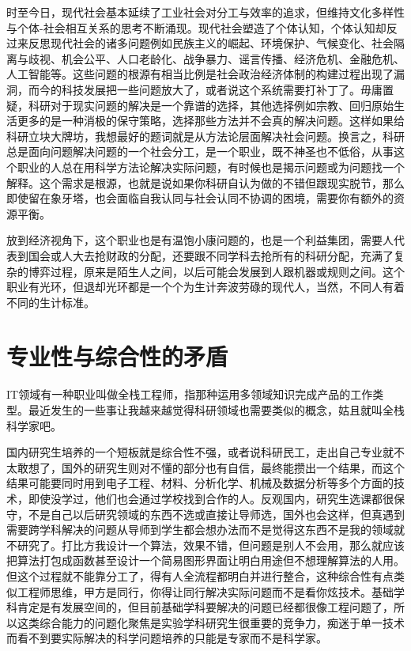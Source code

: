 \documentclass[]{tufte-book}
\begin{document}
时至今日，现代社会基本延续了工业社会对分工与效率的追求，但维持文化多样性与个体-社会相互关系的思考不断涌现。现代社会塑造了个体认知，个体认知却反过来反思现代社会的诸多问题例如民族主义的崛起、环境保护、气候变化、社会隔离与歧视、机会公平、人口老龄化、战争暴力、谣言传播、经济危机、金融危机、人工智能等。这些问题的根源有相当比例是社会政治经济体制的构建过程出现了漏洞，而今的科技发展把一些问题放大了，或者说这个系统需要打补丁了。毋庸置疑，科研对于现实问题的解决是一个靠谱的选择，其他选择例如宗教、回归原始生活更多的是一种消极的保守策略，选择那些方法并不会真的解决问题。这样如果给科研立块大牌坊，我想最好的题词就是从方法论层面解决社会问题。换言之，科研总是面向问题解决问题的一个社会分工，是一个职业，既不神圣也不低俗，从事这个职业的人总在用科学方法论解决实际问题，有时候也是揭示问题或为问题找一个解释。这个需求是根源，也就是说如果你科研自认为做的不错但跟现实脱节，那么即使留在象牙塔，也会面临自我认同与社会认同不协调的困境，需要你有额外的资源平衡。

放到经济视角下，这个职业也是有温饱小康问题的，也是一个利益集团，需要人代表到国会或人大去抢财政的分配，还要跟不同学科去抢所有的科研分配，充满了复杂的博弈过程，原来是陌生人之间，以后可能会发展到人跟机器或规则之间。这个职业有光环，但退却光环都是一个个为生计奔波劳碌的现代人，当然，不同人有着不同的生计标准。

\hypertarget{ux4e13ux4e1aux6027ux4e0eux7efcux5408ux6027ux7684ux77dbux76fe}{%
\section{专业性与综合性的矛盾}\label{ux4e13ux4e1aux6027ux4e0eux7efcux5408ux6027ux7684ux77dbux76fe}}

IT领域有一种职业叫做全栈工程师，指那种运用多领域知识完成产品的工作类型。最近发生的一些事让我越来越觉得科研领域也需要类似的概念，姑且就叫全栈科学家吧。

国内研究生培养的一个短板就是综合性不强，或者说科研民工，走出自己专业就不太敢想了，国外的研究生则对不懂的部分也有自信，最终能攒出一个结果，而这个结果可能要同时用到电子工程、材料、分析化学、机械及数据分析等多个方面的技术，即使没学过，他们也会通过学校找到合作的人。反观国内，研究生选课都很保守，不是自己以后研究领域的东西不选或直接让导师选，国外也会这样，但真遇到需要跨学科解决的问题从导师到学生都会想办法而不是觉得这东西不是我的领域就不研究了。打比方我设计一个算法，效果不错，但问题是别人不会用，那么就应该把算法打包成函数甚至设计一个简易图形界面让明白用途但不想理解算法的人用。但这个过程就不能靠分工了，得有人全流程都明白并进行整合，这种综合性有点类似工程师思维，甲方是同行，你得让同行解决实际问题而不是看你炫技术。基础学科肯定是有发展空间的，但目前基础学科要解决的问题已经都很像工程问题了，所以这类综合能力的问题化聚焦是实验学科研究生很重要的竞争力，痴迷于单一技术而看不到要实际解决的科学问题培养的只能是专家而不是科学家。
\end{document}
